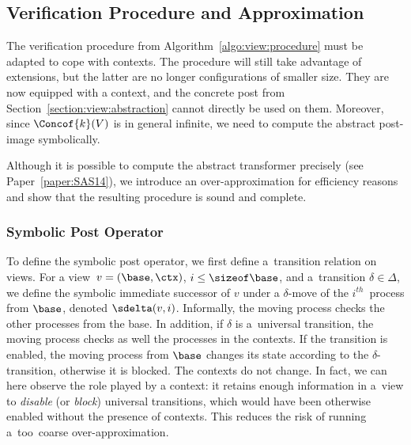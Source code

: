 \subsection{Verification Procedure and Approximation}
%
The verification procedure from Algorithm~\ref{algo:view:procedure}
must be adapted to cope with contexts.
%
The procedure will still take advantage of extensions, but the latter
are no longer configurations of smaller size. They are now equipped
with a context, and the concrete post from
Section~\ref{section:view:abstraction} cannot directly be used on
them. Moreover, since $\Concof{k}(V)$ is in general infinite, we need
to compute the abstract post-image symbolically.
%

Although it is possible to compute the abstract transformer precisely
(see Paper~\ref{paper:SAS14}), we introduce an over-approximation for
efficiency reasons and show that the resulting procedure is sound and
complete.

\subsubsection{Symbolic Post Operator}
\label{section:view:contexts:symbolic:post:operator}
%
To define the symbolic post operator, we first define a~transition
relation on views.
%
For a view~$v=(\base,\ctx)$, $i\leq\sizeof\base$, and a~transition
$\delta\in\Delta$, we define the symbolic immediate successor of $v$
under a $\delta$-move of the $i^{th}$~process from $\base$, denoted
$\sdelta(v,i)$.
%
Informally, the moving process checks the other processes from the
base. In addition, if $\delta$ is a~universal transition, the moving
process checks as well the processes in the contexts.
%
If the transition is enabled, the moving process from $\base$ changes
its state according to the $\delta$-transition, otherwise it is
blocked.
%
The contexts do not change.
%
%
In fact, we can here observe the role played by a context: it retains
enough information in a~view to \emph{disable} (or \emph{block})
universal transitions, which would have been otherwise enabled without
the presence of contexts. %
%
This reduces the risk of running a~too~coarse over-approximation.

